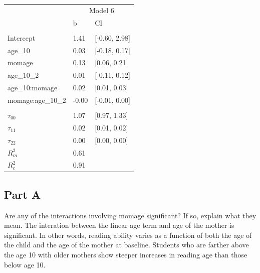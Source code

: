 \documentclass[]{article}
\begin{document}
\begin{table}[H]
\centering
\begin{tabular}{lll}
\toprule
\multicolumn{1}{c}{ } & \multicolumn{2}{c}{Model 6} \\
\cmidrule(l{2pt}r{2pt}){2-3}
 & b & CI\\
\midrule
\addlinespace[0.3em]
\multicolumn{3}{l}{\textbf{Fixed}}\\
\hspace{1em}Intercept & 1.41 & [-0.60, 2.98]\\
\hspace{1em}age\_10 & 0.03 & [-0.18, 0.17]\\
\hspace{1em}momage & 0.13 & [0.06, 0.21]\\
\hspace{1em}age\_10\_2 & 0.01 & [-0.11, 0.12]\\
\hspace{1em}age\_10:momage & 0.02 & [0.01, 0.03]\\
\hspace{1em}momage:age\_10\_2 & -0.00 & [-0.01, 0.00]\\
\addlinespace[0.3em]
\multicolumn{3}{l}{\textbf{Random}}\\
\hspace{1em}$\tau_{00}$ & 1.07 & [0.97, 1.33]\\
\hspace{1em}$\tau_{11}$ & 0.02 & [0.01, 0.02]\\
\hspace{1em}$\tau_{22}$ & 0.00 & [0.00, 0.00]\\
$R^2_m$ & 0.61 & \\
$R^2_c$ & 0.91 & \\
\bottomrule
\end{tabular}
\end{table}

\subsection{Part A}\label{part-a-3}

Are any of the interactions involving momage significant? If so, explain
what they mean. The interation between the linear age term and age of
the mother is significant. In other words, reading ability varies as a
function of both the age of the child and the age of the mother at
baseline. Students who are farther above the age 10 with older mothers
show steeper increases in reading age than those below age 10.
\end{document}
